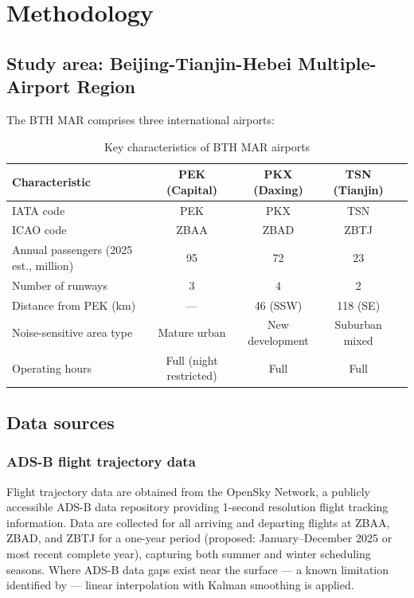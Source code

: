 \documentclass[review,12pt]{elsarticle}
\begin{document}
\section{Methodology}
\label{sec:methodology}

\subsection{Study area: Beijing-Tianjin-Hebei Multiple-Airport Region}

The BTH MAR comprises three international airports:

\begin{table}[h]
\centering
\caption{Key characteristics of BTH MAR airports}
\label{tab:airport_characteristics}
\begin{tabular}{@{}lcccc@{}}
\toprule
Characteristic & PEK (Capital) & PKX (Daxing) & TSN (Tianjin) \\
\midrule
IATA code & PEK & PKX & TSN \\
ICAO code & ZBAA & ZBAD & ZBTJ \\
Annual passengers (2025 est., million) & 95 & 72 & 23 \\
Number of runways & 3 & 4 & 2 \\
Distance from PEK (km) & --- & 46 (SSW) & 118 (SE) \\
Noise-sensitive area type & Mature urban & New development & Suburban mixed \\
Operating hours & Full (night restricted) & Full & Full \\
\bottomrule
\end{tabular}
\end{table}

\subsection{Data sources}

\subsubsection{ADS-B flight trajectory data}

Flight trajectory data are obtained from the OpenSky Network, a publicly accessible ADS-B data repository providing 1-second resolution flight tracking information. Data are collected for all arriving and departing flights at ZBAA, ZBAD, and ZBTJ for a one-year period (proposed: January--December 2025 or most recent complete year), capturing both summer and winter scheduling seasons. Where ADS-B data gaps exist near the surface --- a known limitation identified by \citet{pretto2024aircraft} --- linear interpolation with Kalman smoothing is applied.
\end{document}
